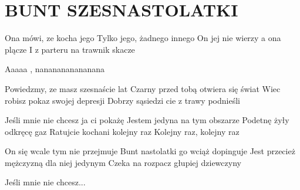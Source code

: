 \documentclass[../../../songbook.tex]{subfiles}
\begin{document}
\TabPositions{8cm} %
\section*{BUNT SZESNASTOLATKI}
{}
\vspace{0.5cm}
Ona mówi, ze kocha jego		  \newline
Tylko jego, żadnego innego \newline
On jej nie wierzy a ona plącze \newline
I z parteru na trawnik skacze \newline

Aaaaa , nananananananana \newline

Powiedzmy, ze masz szesnaście lat \newline
Czarny przed tobą otwiera się świat \newline
Wiec robisz pokaz swojej depresji \newline
Dobrzy sąsiedzi cie z trawy podnieśli \newline

\-\hspace{1cm} Jeśli mnie nie chcesz ja ci pokażę 	  \newline
\-\hspace{1cm} Jestem jedyna na tym obszarze \newline
\-\hspace{1cm} Podetnę żyły odkręcę gaz \newline
\-\hspace{1cm} Ratujcie kochani kolejny raz \newline
\-\hspace{1cm} Kolejny raz, kolejny raz \newline

On się wcale tym nie przejmuje \newline
Bunt nastolatki go wciąż dopinguje \newline
Jest przecież mężczyzną dla niej jedynym \newline
Czeka na rozpacz głupiej dziewczyny \newline

\-\hspace{1cm} Jeśli mnie nie chcesz... \newline
\end{document}
